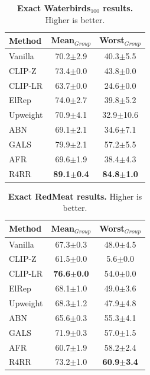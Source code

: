 \documentclass[10pt,twocolumn,letterpaper]{article}
\begin{document}
\begin{table}[h]
\centering
\caption{\textbf{Exact Waterbirds$_{100}$ results.} Higher is better.}
\label{tab:supp_exact_waterbirds100}
\small
\setlength{\tabcolsep}{8pt}
\renewcommand{\arraystretch}{1.12}
\begin{tabular}{lcc}
\toprule
\textbf{Method} & \textbf{Mean$_{Group}$} & \textbf{Worst$_{Group}$} \\
\midrule
Vanilla & 70.2{\scriptsize$\pm$2.9} & 40.3{\scriptsize$\pm$5.5} \\
CLIP-Z & 73.4{\scriptsize$\pm$0.0} & 43.8{\scriptsize$\pm$0.0} \\
CLIP-LR & 63.7{\scriptsize$\pm$0.0} & 24.6{\scriptsize$\pm$0.0} \\
ElRep & 74.0{\scriptsize$\pm$2.7} & 39.8{\scriptsize$\pm$5.2} \\
Upweight & 70.9{\scriptsize$\pm$4.1} & 32.9{\scriptsize$\pm$10.6} \\
ABN & 69.1{\scriptsize$\pm$2.1} & 34.6{\scriptsize$\pm$7.1} \\
GALS & 79.9{\scriptsize$\pm$2.1} & 57.2{\scriptsize$\pm$5.5} \\
AFR & 69.6{\scriptsize$\pm$1.9} & 38.4{\scriptsize$\pm$4.3} \\
R4RR & \textbf{89.1{\scriptsize$\pm$0.4}} & \textbf{84.8{\scriptsize$\pm$1.0}} \\
\bottomrule
\end{tabular}
\end{table}

\begin{table}[h]
\centering
\caption{\textbf{Exact RedMeat results.} Higher is better.}
\label{tab:supp_exact_redmeat}
\small
\setlength{\tabcolsep}{8pt}
\renewcommand{\arraystretch}{1.12}
\begin{tabular}{lcc}
\toprule
\textbf{Method} & \textbf{Mean$_{Group}$} & \textbf{Worst$_{Group}$} \\
\midrule
Vanilla & 67.3{\scriptsize$\pm$0.3} & 48.0{\scriptsize$\pm$4.5} \\
CLIP-Z & 61.5{\scriptsize$\pm$0.0} & 5.6{\scriptsize$\pm$0.0} \\
CLIP-LR & \textbf{76.6{\scriptsize$\pm$0.0}} & 54.0{\scriptsize$\pm$0.0} \\
ElRep & 68.1{\scriptsize$\pm$1.0} & 49.0{\scriptsize$\pm$3.6} \\
Upweight & 68.3{\scriptsize$\pm$1.2} & 47.9{\scriptsize$\pm$4.8} \\
ABN & 65.6{\scriptsize$\pm$0.3} & 55.3{\scriptsize$\pm$4.1} \\
GALS & 71.9{\scriptsize$\pm$0.3} & 57.0{\scriptsize$\pm$1.5} \\
AFR & 60.7{\scriptsize$\pm$1.9} & 58.2{\scriptsize$\pm$2.4} \\
R4RR & 73.2{\scriptsize$\pm$1.0} & \textbf{60.9{\scriptsize$\pm$3.4}} \\
\bottomrule
\end{tabular}
\end{table}
\end{document}
